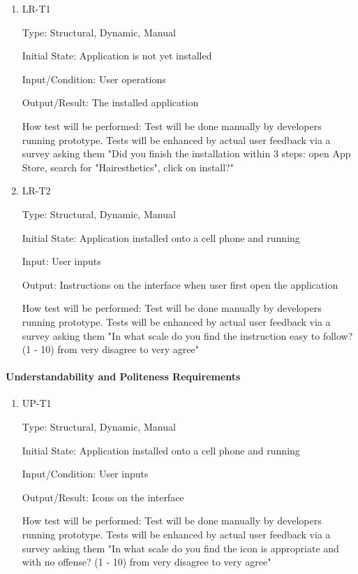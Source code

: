 \documentclass[12pt, titlepage]{article}
\begin{document}
\begin{enumerate}

\item{LR-T1\\}

Type: Structural, Dynamic, Manual
					
Initial State: Application is not yet installed
					
Input/Condition: User operations
					
Output/Result: The installed application
					
How test will be performed: Test will be done manually by developers running prototype. Tests will be enhanced by actual user feedback via a survey asking them "Did you finish the installation within 3 steps: open App Store, search for "Hairesthetics", click on install?"
					
\item{LR-T2\\}

Type: Structural, Dynamic, Manual
					
Initial State: Application installed onto a cell phone and running
					
Input: User inputs
					
Output: Instructions on the interface when user first open the application
					
How test will be performed: Test will be done manually by developers running prototype. Tests will be enhanced by actual user feedback via a survey asking them "In what scale do you find the instruction easy to follow? (1 - 10) from very disagree to very agree"

\end{enumerate}

\paragraph{Understandability and Politeness Requirements}

\begin{enumerate}

\item{UP-T1\\}

Type: Structural, Dynamic, Manual
					
Initial State: Application installed onto a cell phone and running
					
Input/Condition: User inputs
					
Output/Result: Icons on the interface
					
How test will be performed: Test will be done manually by developers running prototype. Tests will be enhanced by actual user feedback via a survey asking them "In what scale do you find the icon is appropriate and with no offense? (1 - 10) from very disagree to very agree"

\end{enumerate}
\end{document}
